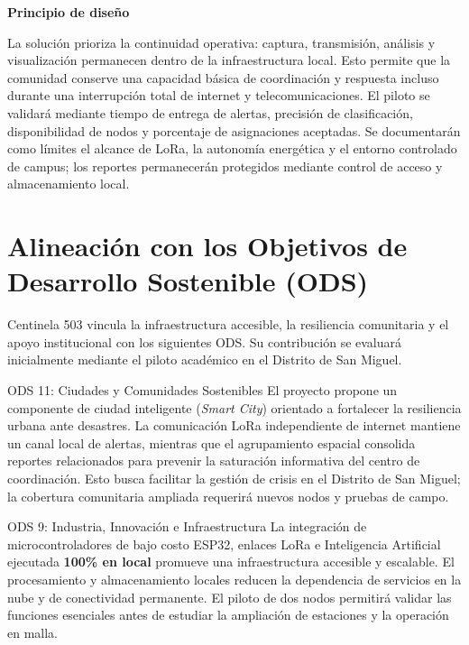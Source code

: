 \documentclass[10pt,letterpaper]{article}
\newcommand{\sectionicon}[1]{\textcolor{cyan}{#1}\enspace}
\begin{document}
\begin{infobox}
\textbf{\textcolor{cyan}{\faLock}\enspace Principio de diseño}\par
\small\justifying
La solución prioriza la continuidad operativa: captura, transmisión, análisis y visualización permanecen dentro de la infraestructura local. Esto permite que la comunidad conserve una capacidad básica de coordinación y respuesta incluso durante una interrupción total de internet y telecomunicaciones.
El piloto se validará mediante tiempo de entrega de alertas, precisión de clasificación, disponibilidad de nodos y porcentaje de asignaciones aceptadas. Se documentarán como límites el alcance de LoRa, la autonomía energética y el entorno controlado de campus; los reportes permanecerán protegidos mediante control de acceso y almacenamiento local.
\end{infobox}

\section[Alineación con los Objetivos de Desarrollo Sostenible (ODS)]{\sectionicon{\faGlobe}Alineación con los Objetivos de Desarrollo Sostenible (ODS)}
\justifying
Centinela 503 vincula la infraestructura accesible, la resiliencia comunitaria y el apoyo institucional con los siguientes ODS. Su contribución se evaluará inicialmente mediante el piloto académico en el Distrito de San Miguel.

\begin{techbox}{\sectionicon{\faCity}ODS 11: Ciudades y Comunidades Sostenibles}
\small\justifying
El proyecto propone un componente de ciudad inteligente (\textit{Smart City}) orientado a fortalecer la resiliencia urbana ante desastres. La comunicación LoRa independiente de internet mantiene un canal local de alertas, mientras que el agrupamiento espacial consolida reportes relacionados para prevenir la saturación informativa del centro de coordinación. Esto busca facilitar la gestión de crisis en el Distrito de San Miguel; la cobertura comunitaria ampliada requerirá nuevos nodos y pruebas de campo.
\end{techbox}

\begin{techbox}{\sectionicon{\faCogs}ODS 9: Industria, Innovación e Infraestructura}
\small\justifying
La integración de microcontroladores de bajo costo ESP32, enlaces LoRa e Inteligencia Artificial ejecutada \textbf{100\% en local} promueve una infraestructura accesible y escalable. El procesamiento y almacenamiento locales reducen la dependencia de servicios en la nube y de conectividad permanente. El piloto de dos nodos permitirá validar las funciones esenciales antes de estudiar la ampliación de estaciones y la operación en malla.
\end{techbox}
\end{document}
